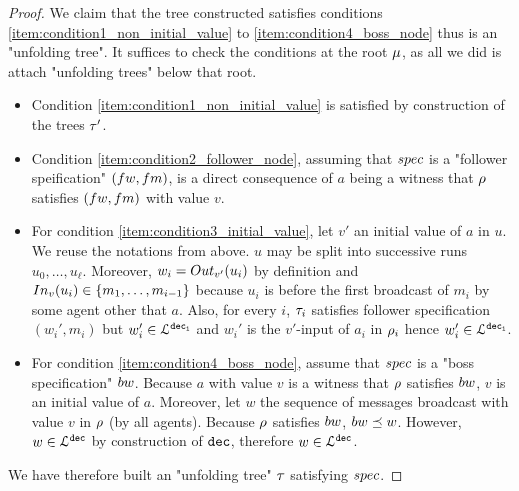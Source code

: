 \begin{proof}
	We claim that the tree constructed satisfies conditions \ref{item:condition1_non_initial_value} to \ref{item:condition4_boss_node} thus is an "unfolding tree". It suffices to check the conditions at the root $\mu$, as all we did is attach "unfolding trees" below that root. 
	\begin{itemize}
	\item Condition \ref{item:condition1_non_initial_value} is satisfied by construction of the trees $\tau'$.
	\item Condition \ref{item:condition2_follower_node}, assuming that $\spec$ is a "follower speification" $(\followwordspec, \followmessagespec)$, is a direct consequence of $a$ being a witness that $\rho$ satisfies $(\followwordspec, \followmessagespec)$ with value $v$. 
	\item For condition \ref{item:condition3_initial_value}, let $v'$ an initial value of $a$ in $u$. We reuse the notations from above. $u$ may be split into successive runs $u_0, \dots, u_\ell$. Moreover, $w_i  = \voutput{v'}{u_i}$ by definition and $\vinput{v}{u_i} \in \set{m_1,\dots,m_{i-1}}$ because $u_i$ is before the first broadcast of $m_i$ by some agent other that $a$. Also, for every $i$, $\tau_i$ satisfies follower specification $(w_i',m_i)$ but $w_i' \in \mathcal{L}^{\mathtt{\mathtt{dec}_i}}$ and $w_i'$ is the $v'$-input of $a_i$ in $\rho_i$ hence $w_i' \in \mathcal{L}^{\mathtt{\mathtt{dec}_i}}$. 
	\item For condition \ref{item:condition4_boss_node}, assume that $\spec$ is a "boss specification" $\bossspec$. Because $a$ with value $v$ is a witness that $\rho$ satisfies $\bossspec$, $v$ is an initial value of $a$. Moreover, let $w$ the sequence of messages broadcast with value $v$ in $\rho$ (by all agents). 
	Because $\rho$ satisfies $\bossspec$, $\bossspec \subword w$. However, $w \in \mathcal{L}^{\mathtt{\mathtt{dec}}}$ by construction of $\mathtt{dec}$, therefore $w \in \mathcal{L}^{\mathtt{\mathtt{dec}}}$.
	\end{itemize}

	We have therefore built an "unfolding tree" $\tau$ satisfying $\spec$. 
\end{proof}
